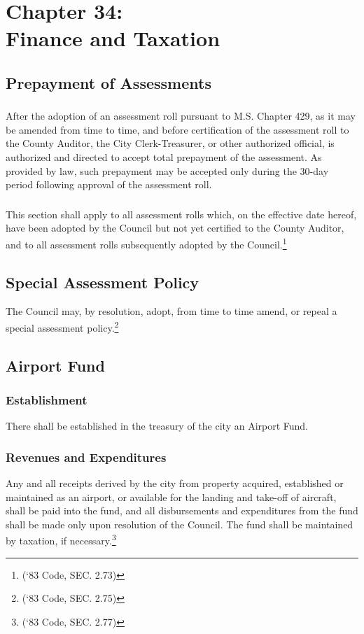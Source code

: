 \chapter*{Chapter 34: \\
	Finance and Taxation}
    \minitoc
    \pagebreak
    
\section{Prepayment of Assessments}
\subsection{}
After the adoption of an assessment roll pursuant to M.S. Chapter 429, as it may be amended from time to time, and before certification of the assessment roll to the County Auditor, the City Clerk-Treasurer, or other authorized official, is authorized and directed to accept total prepayment of the assessment.  As provided by law, such prepayment may be accepted only during the 30-day period following approval of the assessment roll.
\subsection{}
This section shall apply to all assessment rolls which, on the effective date hereof, have been adopted by the Council but not yet certified to the County Auditor, and to all assessment rolls subsequently adopted by the Council.\footnote{(‘83 Code, SEC. 2.73)}
\section{Special Assessment Policy}
The Council may, by resolution, adopt, from time to time amend, or repeal a special assessment policy.\footnote{(‘83 Code, SEC. 2.75)}
\section{Airport Fund}
\subsection{Establishment}
There shall be established in the treasury of the city an Airport Fund.
\subsection{Revenues and Expenditures}
Any and all receipts derived by the city from property acquired, established or maintained as an airport, or available for the landing and take-off of aircraft, shall be paid into the fund, and all disbursements and expenditures from the fund shall be made only upon resolution of the Council.  The fund shall be maintained by taxation, if necessary.\footnote{(‘83 Code, SEC. 2.77)}
